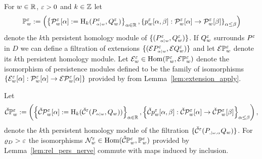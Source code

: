
For $w\in\R$, $\e > 0$ and $k\in\Z$ let
\[\PP{w}{\e} := \left(\left\{\P{w}{\e}{\alpha} := \hom_k(P\subi{w}{\alpha}^\e,Q_w^\e)\right\}_{\alpha\in\R}, \left\{p_w^\e[\alpha,\beta] : \P{w}{\e}{\alpha}\to\P{w}{\e}{\beta}\right\}_{\alpha\leq\beta}\right)\]
denote the $k$th persistent homology module of $\{(P\subi{w}{\alpha}^\e,Q_w^\e)\}$.
If $Q_w^\e$ surrounds $P^\e$ in $D$ we can define a filtration of extensions $\{(\ext{P\subi{w}{\alpha}^\e},\ext{Q_w^\e})\}$ and let $\ext{\PP{w}{\e}}$ denote its $k$th persistent homology module.
Let
$\E_w^\e \in \Hom(\PP{w}{\e},\ext{\PP{w}{\e}})$
denote the isomorphism of persistence modules defined to be the family of isomorphisms $\{\E_w^\e[\alpha] : \P{w}{\e}{\alpha}\to \ext{\P{w}{\e}{\alpha}}\}$ provided by from Lemma~\ref{lem:extension_apply}.

Let
\[\CPP{w}{\e} := \left(\left\{\CP{w}{\e}{\alpha} := \hom_k(\cech^\e(P\subi{w}{\alpha}, Q_w))\right\}_{\alpha\in\R}, \left\{\cech p_w^\e[\alpha,\beta] : \CP{w}{\e}{\alpha}\to\CP{w}{\e}{\beta}\right\}_{\alpha\leq\beta}\right),\]
denote the $k$th persistent homology module of the \Cech filtration $\{\cech^\e(P\subi{\omega,\alpha}, Q_w)\}$.
For $\varrho_D > \e$ the isomorphisms $\N_w^\e\in\Hom(\CPP{w}{\e}, \PP{w}{\e})$ provided by Lemma~\ref{lem:rel_pers_nerve} commute with maps induced by inclusion.

%

